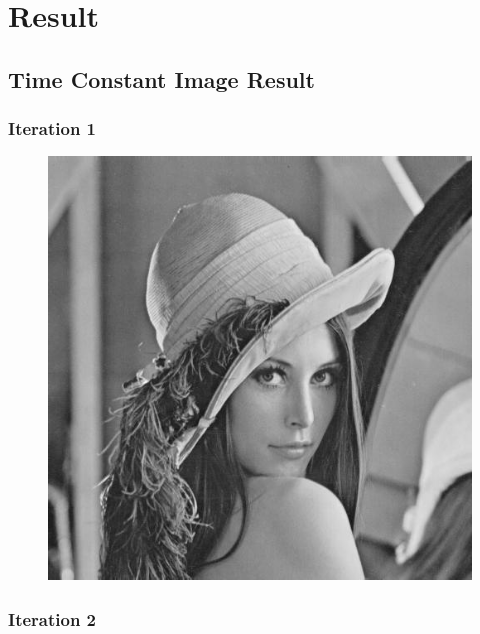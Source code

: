 \documentclass[11pt]{article}
\makeatletter
\def\maxwidth{\ifdim\Gin@nat@width>\linewidth\linewidth
    \else\Gin@nat@width\fi}
\let\Oldincludegraphics\includegraphics
\renewcommand{\includegraphics}[1]{\Oldincludegraphics[width=.8\maxwidth]{#1}}
\makeatother
\begin{document}
\newpage
    \hypertarget{result}{%
\section{Result}\label{result}}

    \hypertarget{time-constant-image-result}{%
\subsection{Time Constant Image
Result}\label{time-constant-image-result}}

    \hypertarget{iteration-1}{%
\subsubsection{Iteration 1}\label{iteration-1}}

\begin{figure}[!htbp]
	\centering
	\includegraphics{"0th iterations_const"}
	\label{fig:0th-iterationsconst}
\end{figure}
\FloatBarrier
\clearpage
    \hypertarget{iteration-2}{%
\subsubsection{Iteration 2}\label{iteration-2}}
\end{document}
